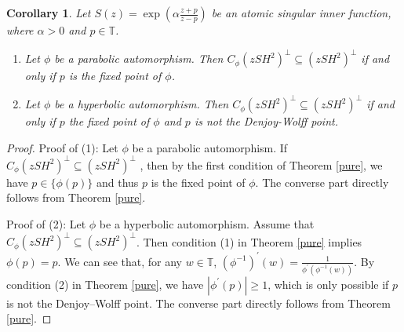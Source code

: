 \documentclass[12pt, reqno]{amsart}
\newtheorem{corollary}[theorem]{Corollary}
\theoremstyle{definition}
\numberwithin{equation}{section}
\begin{document}
\begin{corollary}
	Let $S(z)=\exp(\alpha\frac{z+p}{z-p})$ be an atomic singular inner function, where  $\alpha>0$ and $p \in \mathbb{T}$.
	\begin{enumerate}
		\item	Let $\phi$  be a parabolic automorphism. Then $C_\phi(zSH^2)^\perp\subseteq (zSH^2)^\perp$ if and only if
		$p$ is the fixed point of $\phi$.
		\item  Let $\phi$  be a hyperbolic automorphism. Then $C_\phi(zSH^2)^\perp\subseteq (zSH^2)^\perp$ if and only if
		$p$ the fixed point of $\phi$ and $p$ is not the Denjoy-Wolff point.
\end{enumerate}
	
\end{corollary} 
\begin{proof}
	
Proof of (1):	Let $\phi$ be a parabolic automorphism.
	If $C_\phi(zSH^2)^\perp\subseteq (zSH^2)^\perp$ , then by the first condition of Theorem \ref{pure}, we have $p \in \{\phi(p)\}$ and thus $p$ is the fixed point of $\phi$. The converse part directly follows from Theorem \ref{pure}.
	 
Proof of (2):	Let $\phi$ be a hyperbolic automorphism. Assume that $C_\phi(zSH^2)^\perp\subseteq (zSH^2)^\perp$. Then condition (1) in Theorem \ref{pure} implies $\phi(p)=p$. We can see that, for any $w \in \mathbb{T}$, $(\phi^{-1})^{'}(w)=\frac{1}{\phi^{'}(\phi^{-1}(w))}$. By condition (2) in Theorem \ref{pure}, we have 
$|\phi^{'}(p)|\geq 1$, which is only possible if $p$ is not the  Denjoy–Wolff point. The converse part directly follows from Theorem \ref{pure}.

\end{proof}
\end{document}
